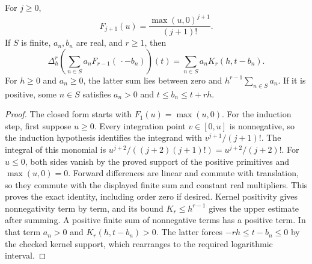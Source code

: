 \begin{lemma}
\label{kernel:finite-detector}
\leanok
For $j\geq0$,
\[
 F_{j+1}(u)=\frac{\max(u,0)^{j+1}}{(j+1)!}.
\]
If $S$ is finite, $a_n,b_n$ are real, and $r\geq1$, then
\[
 \Delta_h^r\!\left(\sum_{n\in S}a_nF_{r-1}(\,\cdot-b_n)\right)(t)
 =\sum_{n\in S}a_n K_r(h,t-b_n).
\]
For $h\geq0$ and $a_n\geq0$, the latter sum lies between zero and
$h^{r-1}\sum_{n\in S}a_n$.
If it is positive, some $n\in S$ satisfies $a_n>0$ and
$t\leq b_n\leq t+rh$.
\end{lemma}
\begin{proof}
The closed form starts with $F_1(u)=\max(u,0)$.
For the induction step, first suppose $u\geq0$.
Every integration point $v\in[0,u]$ is nonnegative, so the induction
hypothesis identifies the integrand with $v^{j+1}/(j+1)!$.
The integral of this monomial is
$u^{j+2}/((j+2)(j+1)!)=u^{j+2}/(j+2)!$.
For $u\leq0$, both sides vanish by the proved support of the positive
primitives and $\max(u,0)=0$.
Forward differences are linear and commute with translation, so they
commute with the displayed finite sum and constant real multipliers.
This proves the exact identity, including order zero if desired.
Kernel positivity gives nonnegativity term by term, and its bound
$K_r\leq h^{r-1}$ gives the upper estimate after summing.
A positive finite sum of nonnegative terms has a positive term.
In that term $a_n>0$ and $K_r(h,t-b_n)>0$.
The latter forces $-rh\leq t-b_n\leq0$ by the checked kernel support,
which rearranges to the required logarithmic interval.
\end{proof}

